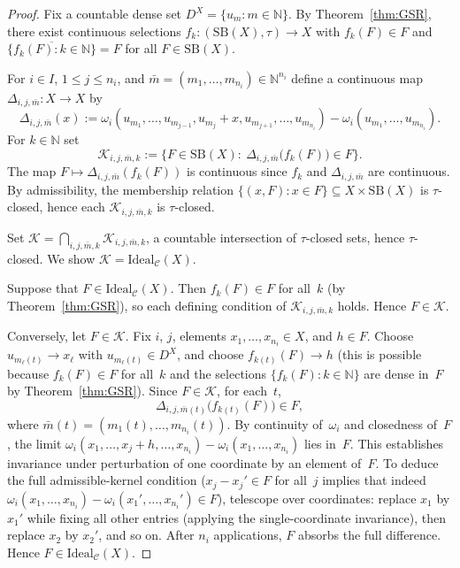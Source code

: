 \documentclass[12pt,fleqn,a4paper]{amsart}
\renewcommand{\le}{\leqslant}
\numberwithin{equation}{section}
\theoremstyle{definition}
\newcommand{\N}{\mathbb{N}}
\newcommand{\SB}{\mathrm{SB}}
\newcommand{\Ideal}{\mathrm{Ideal}}
\begin{document}
\begin{proof}
Fix a countable dense set $D^X=\{u_m:m\in\N\}$.  By Theorem~\ref{thm:GSR}, there
exist continuous selections $f_k:(\SB(X),\tau)\to X$ with $f_k(F)\in F$ and
$\overline{\{f_k(F):k\in\N\}}=F$ for all $F\in\SB(X)$.

For $i\in I$, $1\le j\le n_i$, and $\bar m=(m_1,\dots,m_{n_i})\in\N^{n_i}$ define
a continuous map $\Delta_{i,j,\bar m}:X\to X$ by
\[
\Delta_{i,j,\bar m}(x):=
\omega_i(u_{m_1},\dots,u_{m_{j-1}},u_{m_j}+x,u_{m_{j+1}},\dots,u_{m_{n_i}})
-\omega_i(u_{m_1},\dots,u_{m_{n_i}}).
\]
For $k\in\N$ set
\[
\mathcal K_{i,j,\bar m,k}
:=\bigl\{F\in\SB(X):\ \Delta_{i,j,\bar m}\bigl(f_k(F)\bigr)\in F\bigr\}.
\]
The map $F\mapsto \Delta_{i,j,\bar m}(f_k(F))$ is continuous since
$f_k$ and $\Delta_{i,j,\bar m}$ are continuous.
By admissibility, the membership relation $\{(x,F):x\in F\}\subseteq X\times\SB(X)$
is $\tau$-closed, hence each $\mathcal K_{i,j,\bar m,k}$ is $\tau$-closed.

Set $\mathcal K=\bigcap_{i,j,\bar m,k}\mathcal K_{i,j,\bar m,k}$,
a countable intersection of $\tau$-closed sets, hence $\tau$-closed.
We show $\mathcal K=\Ideal_{\mathcal C}(X)$.

Suppose that $F\in\Ideal_{\mathcal C}(X)$.  Then $f_k(F)\in F$ for all~$k$
(by Theorem~\ref{thm:GSR}), so each defining condition of $\mathcal K_{i,j,\bar m,k}$ holds.
Hence $F\in\mathcal K$.

Conversely, let $F\in\mathcal K$.  Fix $i$, $j$, elements
$x_1,\dots,x_{n_i}\in X$, and $h\in F$.
Choose $u_{m_\ell(t)}\to x_\ell$ with $u_{m_\ell(t)}\in D^X$,
and choose $f_{k(t)}(F)\to h$ (this is possible because $f_k(F)\in F$ for all~$k$ and
the selections $\{f_k(F):k\in\N\}$ are dense in~$F$ by Theorem~\ref{thm:GSR}).
Since $F\in\mathcal K$, for each~$t$,
\[
\Delta_{i,j,\bar m(t)}\bigl(f_{k(t)}(F)\bigr)\in F,
\]
where $\bar m(t)=(m_1(t),\dots,m_{n_i}(t))$.
By continuity of~$\omega_i$ and closedness of~$F$, the limit
$\omega_i(x_1,\dots,x_j+h,\dots,x_{n_i})-\omega_i(x_1,\dots,x_{n_i})$
lies in~$F$. This establishes invariance under perturbation of one coordinate by an element of~$F$.
To deduce the full admissible-kernel condition
($x_j-x_j'\in F$ for all~$j$ implies that indeed 
$\omega_i(x_1,\dots,x_{n_i})-\omega_i(x_1',\dots,x_{n_i}')\in F$),
telescope over coordinates: replace $x_1$ by $x_1'$ while fixing all other entries
(applying the single-coordinate invariance), then replace $x_2$ by $x_2'$, and so on.
After $n_i$ applications, $F$ absorbs the full difference.
Hence $F\in\Ideal_{\mathcal C}(X)$.

\end{proof}
\end{document}
